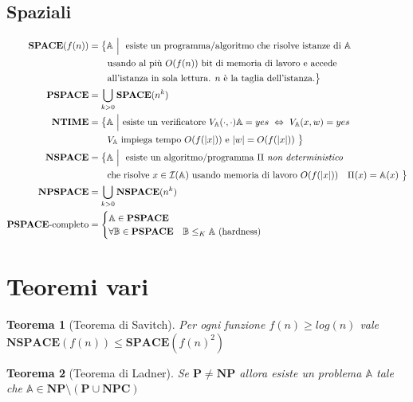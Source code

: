 \documentclass[a4paper, 11pt]{article}
\newcommand{\p}{\mathbf{P}}
\newcommand{\np}{\mathbf{NP}}
\newcommand{\npc}{\mathbf{NPC}}
\newcommand{\ntime}{\mathbf{NTIME}}
\newcommand{\Space}{\mathbf{SPACE}}
\newcommand{\pspace}{\mathbf{PSPACE}}
\newcommand{\nspace}{\mathbf{NSPACE}}
\newcommand{\npspace}{\mathbf{NPSPACE}}
\newcommand{\prob}[1]{\mathbb{#1}}
\newcommand{\instance}[1]{\mathcal{I}(\prob{#1})}
\newtheorem{thm}{Teorema}[subsection]
\begin{document}
	\subsection{Spaziali}
	\begin{align*}
		\Space(f(n)) &= \big\lbrace \prob{A}\ \Big|\ \text{ esiste un programma/algoritmo che risolve istanze di } \prob{A} \\ 
		& \qquad \text{usando al più } O(f(n)) \text{ bit di memoria di lavoro e accede }\\
		&\qquad \text{all'istanza in sola lettura. } n \text{ è la taglia dell'istanza}. \big\rbrace \\
		\pspace &= \bigcup\limits_{k > 0} \Space(n^k) \\
			\ntime &= \big\lbrace \prob{A} \ \Big| \ \text{esiste un verificatore } V_{\prob{A}}(\cdot, \cdot) \prob{A} = yes \ \Leftrightarrow\ V_{\prob{A}}(x, w) = yes \\
		& \qquad V_{\prob{A}} \text{ impiega tempo } O(f(\vert x \vert)) \text{ e }\vert w \vert = O(f(\vert x \vert)) \ \big\rbrace \\
		\nspace &= \big\lbrace  \prob{A}\ \Big| \ \text{ esiste un algoritmo/programma } \Pi \text{ \textit{non deterministico}} \\
		& \qquad \text{che risolve } x \in \instance{A} \text{ usando memoria di lavoro } O(f(\vert x\vert)) \quad \Pi(x) = \prob{A}(x) \ \big\rbrace \\
		\npspace &= \bigcup\limits_{k > 0} \nspace(n^k) \\
		\pspace\text{-completo} &=\begin{cases}
		 \prob{A} \in \pspace  \\
		 \forall \prob{B} \in \pspace \quad \prob{B} \leq_K \prob{A} \  (\text{hardness}) \\
		\end{cases}\\
	\end{align*}
	
	\section{Teoremi vari}
	\begin{thm}[Teorema di Savitch]
		Per ogni funzione $f(n) \geq log(n)$ vale \\ $ \nspace(f(n)) \leq \Space(f(n)^2) $
	\end{thm}

	\begin{thm}[Teorema di Ladner]
		Se $\p \neq \np$ allora esiste un problema $\mathbb{A}$ tale che $\prob{A} \in \np \setminus (\p \cup \npc)$
	\end{thm}
\end{document}
